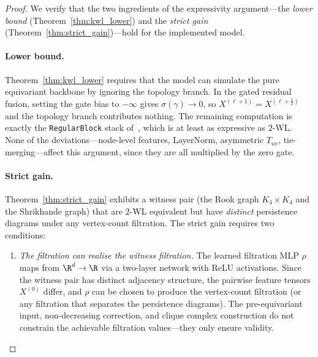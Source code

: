 \begin{proof}
We verify that the two ingredients of the expressivity argument---the \emph{lower bound} (Theorem~\ref{thm:kwl_lower}) and the \emph{strict gain} (Theorem~\ref{thm:strict_gain})---hold for the implemented model.

\paragraph{Lower bound.}
Theorem~\ref{thm:kwl_lower} requires that the model can simulate the pure equivariant backbone by ignoring the topology branch. In the gated residual fusion, setting the gate bias to $-\infty$ gives $\sigma(\gamma) \to 0$, so $X^{(\ell+1)} = X^{(\ell+\frac{1}{2})}$ and the topology branch contributes nothing. The remaining computation is exactly the \texttt{RegularBlock} stack of~\cite{maron2019provably}, which is at least as expressive as $2$-WL. None of the deviations---node-level features, LayerNorm, asymmetric $T_{uv}$, tie-merging---affect this argument, since they are all multiplied by the zero gate.

\paragraph{Strict gain.}
Theorem~\ref{thm:strict_gain} exhibits a witness pair (the Rook graph $K_4 \times K_4$ and the Shrikhande graph) that are $2$-WL equivalent but have \emph{distinct} persistence diagrams under any vertex-count filtration. The strict gain requires two conditions:

\begin{enumerate}
    \item \emph{The filtration can realise the witness filtration.} The learned filtration MLP $\rho$ maps from $\R^d \to \R$ via a two-layer network with ReLU activations. Since the witness pair has distinct adjacency structure, the pairwise feature tensors $X^{(0)}$ differ, and $\rho$ can be chosen to produce the vertex-count filtration (or any filtration that separates the persistence diagrams). The pre-equivariant input, non-decreasing correction, and clique complex construction do not constrain the achievable filtration values---they only ensure validity.


\end{enumerate}
\end{proof}
